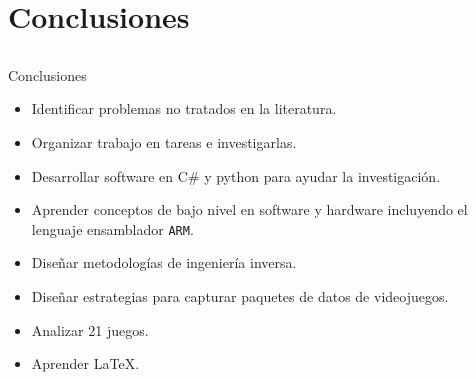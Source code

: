 
\section{Conclusiones}
\subsection{}

\begin{frame}{Conclusiones}
\begin{itemize}
    \item<+-> Identificar problemas no tratados en la literatura.

    \item<+-> Organizar trabajo en tareas e investigarlas.

    \item<+-> Desarrollar software en C\# y python para ayudar la investigación.

    \item<+-> Aprender conceptos de bajo nivel en software y hardware incluyendo el lenguaje ensamblador \texttt{ARM}.

    \item<+-> Diseñar metodologías de ingeniería inversa.

    \item<+-> Diseñar estrategias para capturar paquetes de datos de videojuegos.

    \item<+-> Analizar 21 juegos.

    \item<+-> Aprender \LaTeX.
\end{itemize}
\end{frame}


